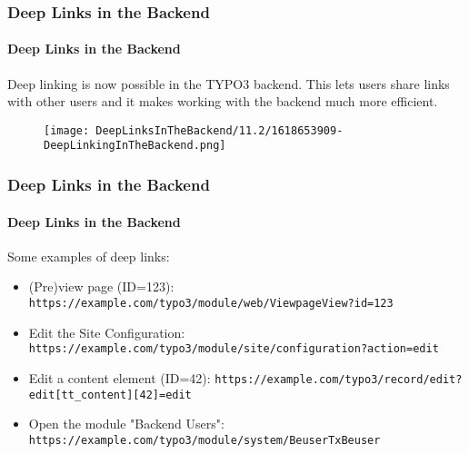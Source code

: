 %

\begin{frame}[fragile]
	\frametitle{Deep Links in the Backend}
	\framesubtitle{Deep Links in the Backend}

	Deep linking is now possible in the TYPO3 backend. This lets users share links
	with other users and it makes working with the backend much more efficient.

	\begin{figure}
		\texttt{[image: DeepLinksInTheBackend/11.2/1618653909-DeepLinkingInTheBackend.png]}
	\end{figure}

\end{frame}


\begin{frame}[fragile]
	\frametitle{Deep Links in the Backend}
	\framesubtitle{Deep Links in the Backend}

	Some examples of deep links:
	\vspace{0.2cm}
	\begin{itemize}
		\item (Pre)view page (ID=123):\newline
			\fontsize{8}{10}\texttt{https://example.com/typo3/module/web/ViewpageView?id=123}\normalsize
		\item Edit the Site Configuration:
			\fontsize{8}{10}\texttt{https://example.com/typo3/module/site/configuration?action=edit}\normalsize
		\item Edit a content element (ID=42):
			\fontsize{8}{10}\texttt{https://example.com/typo3/record/edit?edit[tt\_content][42]=edit}\normalsize
		\item Open the module "Backend Users":
			\fontsize{8}{10}\texttt{https://example.com/typo3/module/system/BeuserTxBeuser}\normalsize
	\end{itemize}

\end{frame}

